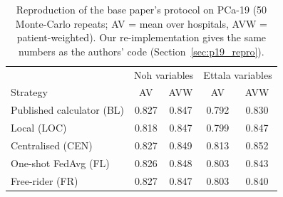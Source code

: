 \begin{table}[t]
\caption{Reproduction of the base paper's protocol on PCa-19 (50 Monte-Carlo repeats; AV = mean over hospitals, AVW = patient-weighted). Our re-implementation gives the same numbers as the authors' code (Section~\ref{sec:p19_repro}).}
\centering\footnotesize
\begin{tabular}{lcccc}
\toprule
& \multicolumn{2}{c}{Noh variables} & \multicolumn{2}{c}{Ettala variables} \\
Strategy & AV & AVW & AV & AVW \\
\midrule
Published calculator (BL) & 0.827 & 0.847 & 0.792 & 0.830 \\
Local (LOC) & 0.818 & 0.847 & 0.799 & 0.847 \\
Centralised (CEN) & 0.827 & 0.849 & 0.813 & 0.852 \\
One-shot FedAvg (FL) & 0.826 & 0.848 & 0.803 & 0.843 \\
Free-rider (FR) & 0.827 & 0.847 & 0.803 & 0.840 \\
\bottomrule
\end{tabular}
\label{tab:pca19_repro}
\end{table}
